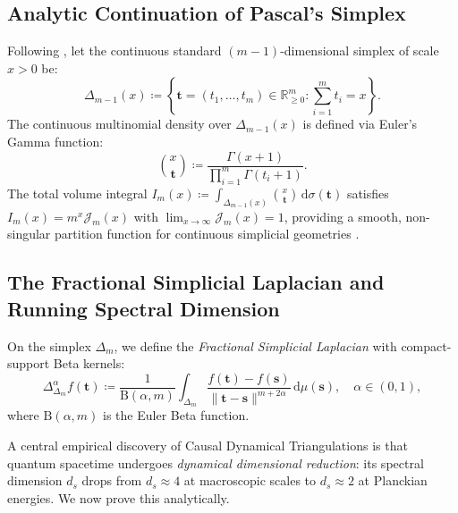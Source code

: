 \documentclass[11pt,a4paper,reqno]{amsart}
\theoremstyle{definition}
\numberwithin{equation}{section}
\providecommand{\R}{\mathbb{R}}
\newcommand{\dif}{\,\mathrm{d}}
\providecommand{\R}{\mathbb{R}}
\begin{document}
\subsection{Analytic Continuation of Pascal's Simplex}
Following \cite{silvafilho2026pascal}, let the continuous standard $(m-1)$-dimensional simplex of scale $x > 0$ be:
\begin{equation}
    \label{eq:standard_simplex}
    \Delta_{m-1}(x) \coloneqq \left\{ \mathbf{t} = (t_1, \dots, t_m) \in \R_{\ge 0}^m \colon \sum_{i=1}^m t_i = x \right\}.
\end{equation}
The continuous multinomial density over $\Delta_{m-1}(x)$ is defined via Euler's Gamma function:
\begin{equation}
    \label{eq:continuous_multinomial}
    \binom{x}{\mathbf{t}} \coloneqq \frac{\Gamma(x + 1)}{\prod_{i=1}^m \Gamma(t_i + 1)}.
\end{equation}
The total volume integral $I_m(x) \coloneqq \int_{\Delta_{m-1}(x)} \binom{x}{\mathbf{t}} \dif \sigma(\mathbf{t})$ satisfies $I_m(x) = m^x \mathcal{J}_m(x)$ with $\lim_{x \to \infty} \mathcal{J}_m(x) = 1$, providing a smooth, non-singular partition function for continuous simplicial geometries \cite{silvafilho2026pascal}.

\subsection{The Fractional Simplicial Laplacian and Running Spectral Dimension}
On the simplex $\Delta_m$, we define the \emph{Fractional Simplicial Laplacian} with compact-support Beta kernels:
\begin{equation}
    \label{eq:frac_simplicial_laplacian}
    \Delta_{\Delta_m}^\alpha f(\mathbf{t}) \coloneqq \frac{1}{\mathrm{B}(\alpha, m)} \int_{\Delta_m} \frac{f(\mathbf{t}) - f(\mathbf{s})}{\|\mathbf{t} - \mathbf{s}\|^{m + 2\alpha}} \dif \mu(\mathbf{s}), \quad \alpha \in (0, 1),
\end{equation}
where $\mathrm{B}(\alpha, m)$ is the Euler Beta function.

A central empirical discovery of Causal Dynamical Triangulations \cite{ambjorn2005spectral} is that quantum spacetime undergoes \emph{dynamical dimensional reduction}: its spectral dimension $d_s$ drops from $d_s \approx 4$ at macroscopic scales to $d_s \approx 2$ at Planckian energies. We now prove this analytically.
\end{document}
